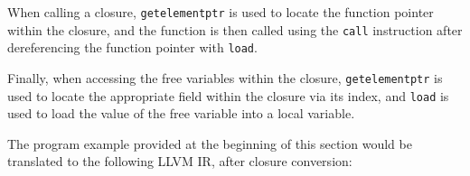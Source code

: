 When calling a closure, \texttt{getelementptr} is used to locate the function pointer within the
closure, and the function is then called using the \texttt{call} instruction after dereferencing the
function pointer with \texttt{load}.

Finally, when accessing the free variables within the closure, \texttt{getelementptr} is used to
locate the appropriate field within the closure via its index, and \texttt{load} is used to load the
value of the free variable into a local variable.

The program example provided at the beginning of this section would be translated to the following
LLVM IR, after closure conversion:

